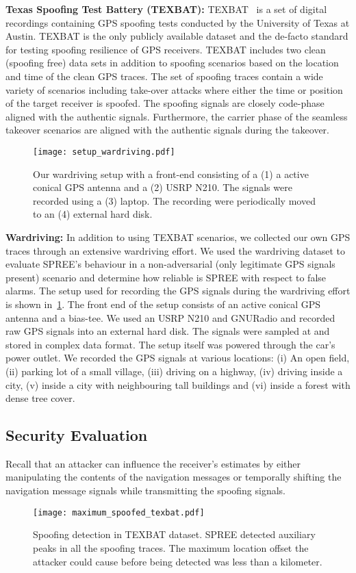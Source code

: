 \documentclass[letterpaper,twocolumn,10pt]{article}
\newcommand{\rxname}{SPREE\xspace}
\begin{document}
\noindent\textbf{Texas Spoofing Test Battery (TEXBAT):} TEXBAT~\cite{humphreys2012texas} is a set of digital recordings containing GPS spoofing tests conducted by the University of Texas at Austin. TEXBAT is the only publicly available dataset and the de-facto standard for testing spoofing resilience of GPS receivers. TEXBAT includes two clean (spoofing free) data sets in addition to spoofing scenarios based on the location and time of the clean GPS traces. The set of spoofing traces contain a wide variety of scenarios including take-over attacks where either the time or position of the target receiver is spoofed. The spoofing signals are closely code-phase aligned with the authentic signals. Furthermore, the carrier phase of the seamless takeover scenarios are aligned with the authentic signals during the takeover.\\


\begin{figure}[t]
  \centering
  \texttt{[image: setup\_wardriving.pdf]}
  \caption{Our wardriving setup with a front-end consisting of a (1) a active conical GPS antenna and a (2) USRP N210. The signals were recorded using a (3) laptop. The recording were periodically moved to an (4) external hard disk.}
  \label{fig:wardriving}
\end{figure}


\noindent\textbf{Wardriving:} In addition to using TEXBAT scenarios, we collected our own  GPS traces through an extensive wardriving effort. We used the wardriving dataset to evaluate \rxname's behaviour in a non-adversarial (only legitimate GPS signals present) scenario and determine how reliable is \rxname with respect to false alarms. The setup used for recording the GPS signals during the wardriving effort is shown in~\ref{fig:wardriving}. The front end of the setup consists of an active conical GPS antenna and a bias-tee. We used an USRP N210 and GNURadio and recorded raw GPS signals into an external hard disk. The signals were sampled at  and stored in complex data format. The setup itself was powered through the car's power outlet. We recorded the GPS signals at various locations: (i) An open field, (ii) parking lot of a small village, (iii) driving on a highway, (iv) driving inside a city, (v) inside a city with neighbouring tall buildings and (vi) inside a forest with dense tree cover. 

\subsection{Security Evaluation}
Recall that an attacker can influence the receiver's estimates by either manipulating the contents of the navigation messages or temporally shifting the navigation message signals while transmitting the spoofing signals.\\
\begin{figure}[t]
\centering
  \texttt{[image: maximum\_spoofed\_texbat.pdf]}
  \caption{Spoofing detection in TEXBAT dataset. \rxname detected auxiliary peaks in all the spoofing traces. The maximum location offset the attacker could cause before being detected was less than a kilometer.}
  \label{fig:texbat_auxpeaks}
\end{figure}
\end{document}
